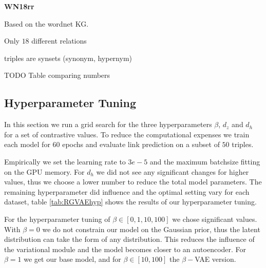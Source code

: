 
\textbf{WN18rr}

Based on the wordnet KG.

Only $18$ different relations

triples are synsets (synonym, hypernym)

TODO Table comparing numbers

\subsection{Hyperparameter Tuning}

In this section we run a grid search for the three hyperparameters $\beta$, $d_z$ and $d_h$ for a set of contrastive values. To reduce the computational expenses we train each model for $60$ epochs and  evaluate link prediction on a subset of $50$ triples.

Empirically we set the learning rate to $3e-5$ and the maximum batchsize fitting on the GPU memory. For $d_h$ we did not see any significant changes for higher values, thus we choose a lower number to reduce the total model parameters. The remaining hyperparameter did influence and the optimal setting vary for each dataset, table \ref{tab:RGVAEhyp} shows the results of our hyperparameter tuning.


For the hyperparameter tuning of $\beta \in [0,1,10,100]$ we chose significant values. With $\beta = 0$ we do not constrain our model on the Gaussian prior, thus the latent distribution can take the form of any distribution. This reduces the influence of the variational module and the model becomes closer to an autoencoder. For $\beta = 1$ we get our base model, and for $\beta \in [10,100]$ the $\beta-$VAE version.


